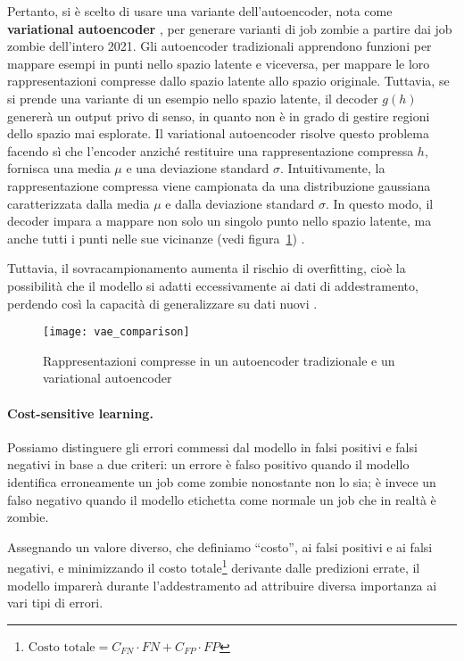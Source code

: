 Pertanto, si è scelto di usare una variante dell'autoencoder, nota come
\textbf{variational autoencoder} \cite{kingma2022}, per generare varianti di
job zombie a partire dai job zombie dell'intero 2021. Gli autoencoder
tradizionali apprendono funzioni per mappare esempi in punti nello spazio
latente e viceversa, per mappare le loro rappresentazioni compresse dallo
spazio latente allo spazio originale. Tuttavia, se si prende una variante di
un esempio nello spazio latente, il decoder $g(h)$ genererà un output privo di
senso, in quanto non è in grado di gestire regioni dello spazio mai esplorate.
Il variational autoencoder risolve questo problema facendo sì che l'encoder
anziché restituire una rappresentazione compressa $h$, fornisca una media
$\mu$ e una deviazione standard $\sigma$. Intuitivamente, la rappresentazione
compressa viene campionata da una distribuzione gaussiana caratterizzata dalla
media $\mu$ e dalla deviazione standard $\sigma$. In questo modo, il decoder
impara a mappare non solo un singolo punto nello spazio latente, ma anche
tutti i punti nelle sue vicinanze (vedi figura~\ref{fig:vae_comparison})
\cite{shafkat2018}.

Tuttavia, il sovracampionamento aumenta il rischio di overfitting, cioè la
possibilità che il modello si adatti eccessivamente ai dati di addestramento,
perdendo così la capacità di generalizzare su dati nuovi \cite{fernandez2018}.

\begin{figure}
    \centering
    \texttt{[image: vae\_comparison]}
    \caption{Rappresentazioni compresse in un autoencoder tradizionale e un
    variational autoencoder \cite{shafkat2018}}
    \label{fig:vae_comparison}
\end{figure}

\paragraph{Cost-sensitive learning.}

Possiamo distinguere gli errori commessi dal modello in falsi positivi e falsi
negativi in base a due criteri: un errore è falso positivo quando il modello
identifica erroneamente un job come zombie nonostante non lo sia; è invece un
falso negativo quando il modello etichetta come normale un job che in realtà è
zombie.

Assegnando un valore diverso, che definiamo ``costo'', ai falsi positivi e ai
falsi negativi, e minimizzando il costo totale\footnote{$\text{Costo totale} =
    C_{FN} \cdot
FN + C_{FP} \cdot FP$} derivante dalle predizioni
errate, il modello imparerà durante l'addestramento ad attribuire diversa
importanza ai vari tipi di errori.

